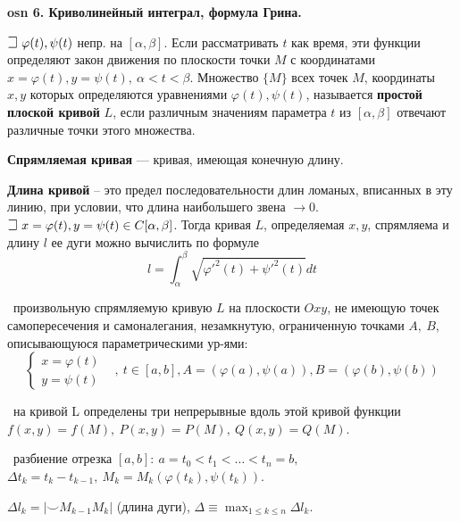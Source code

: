 \setcounter{section}{15}
\setcounter{subsection}{6}
\setcounter{equation}{0}
\textbf{\LARGE osn 6. Криволинейный интеграл, формула Грина.}

$\mathLet ~ \varphi(t), \psi(t)$ непр. на $[\alpha,\beta]$. 
Если рассматривать $t$ как время, эти функции определяют закон движения по плоскости точки $M$ с координатами 
$x = \varphi(t), y = \psi(t), ~ \alpha < t < \beta$. Множество $\{M\}$ всех точек $M$, координаты $x,y$ которых определяются уравнениями $\varphi(t), \psi(t)$, называется \textbf{простой плоской кривой} $L$, если различным значениям параметра $t$ из $[\alpha, \beta]$ отвечают различные точки этого множества.


\textbf{Спрямляемая кривая} --- кривая, имеющая конечную длину.

\textbf{Длина кривой} -- это предел последовательности длин ломаных, вписанных в эту линию, при условии, что длина наибольшего звена $\rightarrow 0$.\\

$\mathLet ~ x = \varphi(t), y = \psi(t) \in C[\alpha, \beta]$. Тогда кривая $L$, определяемая $x, y$, спрямляема и длину $l$ ее дуги можно вычислить по формуле
$$l = \int^{\beta}_{\alpha} \sqrt{\varphi'^2(t) + \psi'^2(t)}dt$$

\faEye \ произвольную спрямляемую кривую $L$ на плоскости $Oxy$, не имеющую точек самопересечения и самоналегания, незамкнутую, ограниченную точками $A,~B$, описывающуюся параметрическими ур-ями:
$$\begin{cases} x=\varphi(t)&\\ y=\psi(t)\end{cases},~t\in [a,b], A=(\varphi(a),\psi(a)), B=(\varphi(b),\psi(b))$$

\mathLet \ на кривой L определены три непрерывные вдоль этой кривой функции $f(x,y)=f(M),~P(x,y)=P(M),~Q(x,y)=Q(M)$.

\faEye \ разбиение отрезка 
$[a,b]:~a=t_0 < t_1 < \dots < t_n = b,~$
$\Delta t_k = t_k-t_{k-1}, ~ M_k = M_k(\varphi(t_k),\psi(t_k))$.

$\Delta l_k = |\smile M_{k-1}M_k|$ (длина дуги), $\Delta \equiv \displaystyle\max_{1\leqslant k\leqslant n} \Delta l_k$.

